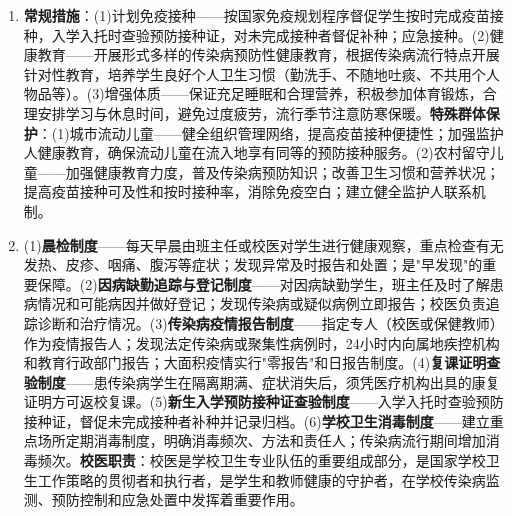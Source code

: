 \begin{enumerate}[leftmargin=*, itemsep=5pt]
    \item \textbf{常规措施}：(1)计划免疫接种——按国家免疫规划程序督促学生按时完成疫苗接种，入学入托时查验预防接种证，对未完成接种者督促补种；应急接种。(2)健康教育——开展形式多样的传染病预防性健康教育，根据传染病流行特点开展针对性教育，培养学生良好个人卫生习惯（勤洗手、不随地吐痰、不共用个人物品等）。(3)增强体质——保证充足睡眠和合理营养，积极参加体育锻炼，合理安排学习与休息时间，避免过度疲劳，流行季节注意防寒保暖。\textbf{特殊群体保护}：(1)城市流动儿童——健全组织管理网络，提高疫苗接种便捷性；加强监护人健康教育，确保流动儿童在流入地享有同等的预防接种服务。(2)农村留守儿童——加强健康教育力度，普及传染病预防知识；改善卫生习惯和营养状况；提高疫苗接种可及性和按时接种率，消除免疫空白；建立健全监护人联系机制。

    \item (1)\textbf{晨检制度}——每天早晨由班主任或校医对学生进行健康观察，重点检查有无发热、皮疹、咽痛、腹泻等症状；发现异常及时报告和处置；是"早发现"的重要保障。(2)\textbf{因病缺勤追踪与登记制度}——对因病缺勤学生，班主任及时了解患病情况和可能病因并做好登记；发现传染病或疑似病例立即报告；校医负责追踪诊断和治疗情况。(3)\textbf{传染病疫情报告制度}——指定专人（校医或保健教师）作为疫情报告人；发现法定传染病或聚集性病例时，24小时内向属地疾控机构和教育行政部门报告；大面积疫情实行"零报告"和日报告制度。(4)\textbf{复课证明查验制度}——患传染病学生在隔离期满、症状消失后，须凭医疗机构出具的康复证明方可返校复课。(5)\textbf{新生入学预防接种证查验制度}——入学入托时查验预防接种证，督促未完成接种者补种并记录归档。(6)\textbf{学校卫生消毒制度}——建立重点场所定期消毒制度，明确消毒频次、方法和责任人；传染病流行期间增加消毒频次。\textbf{校医职责}：校医是学校卫生专业队伍的重要组成部分，是国家学校卫生工作策略的贯彻者和执行者，是学生和教师健康的守护者，在学校传染病监测、预防控制和应急处置中发挥着重要作用。
\end{enumerate}

\newpage
